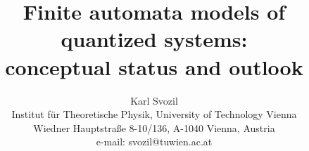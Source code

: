 \documentclass[a4paper,11pt]{article}
\RequirePackage{times}
\RequirePackage{courier}
\RequirePackage{mathptm}
\textheight 193mm
\textwidth 122mm
\pagestyle{empty}
\RequirePackage{graphicx}



\title{Finite automata models of quantized systems:\\conceptual status and outlook}
\author{Karl Svozil\\
 {\small Institut f\"ur Theoretische Physik, University of Technology Vienna }     \\
  {\small Wiedner Hauptstra\ss e 8-10/136,}
  {\small A-1040 Vienna, Austria   }            \\
  {\small e-mail: svozil@tuwien.ac.at}}

\maketitle
\begin{abstract}
Since Edward Moore, finite automata theory has been inspired
by physics, in particular by quantum complementarity. We review
automaton complementarity, reversible automata and the connections
to generalized urn models. Recent developments in quantum information theory
may have appropriate formalizations in the automaton context.
\end{abstract}




\section{Physical connections}

Physics and computer science share common interests.
They may pursue their investigations by different methods and formalisms,
but once in a while it is quite obvious that the interrelations are pertinent.
Take, for example, the concepts of information and computation.
Per definition, any theory of information and computation,
in order to be applicable, should refer to
physically operationalizable concepts.
After all, information and computation is physical \cite{landauer}.

